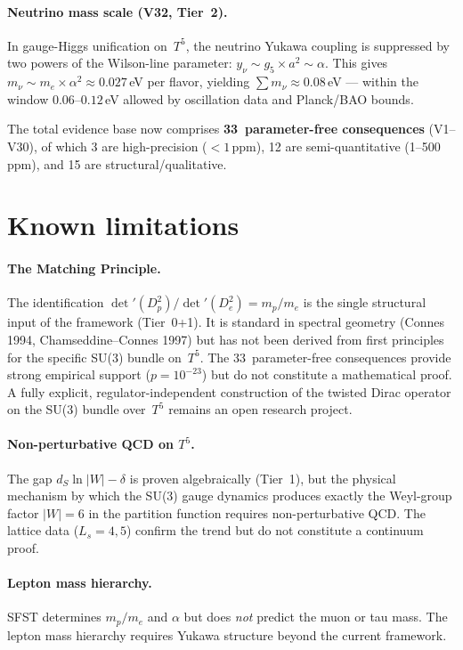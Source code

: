 \documentclass[11pt,a4paper]{article}
\theoremstyle{definition}
\theoremstyle{remark}
\begin{document}
\paragraph{Neutrino mass scale (V32, Tier~2).}
In gauge-Higgs unification on~$T^5$, the neutrino Yukawa coupling is
suppressed by two powers of the Wilson-line parameter:
$y_\nu \sim g_5 \times a^2 \sim \alpha$.
This gives $m_\nu \sim m_e \times \alpha^2 \approx 0.027\,$eV per flavor,
yielding $\sum m_\nu \approx 0.08\,$eV --- within the window
$0.06$--$0.12\,$eV allowed by oscillation data and Planck/BAO bounds.

The total evidence base now comprises \textbf{33~parameter-free consequences}
(V1--V30), of which 3 are high-precision ($<\!1\,$ppm), 12 are
semi-quantitative (1--500\,ppm), and 15 are structural/qualitative.

\section{Known limitations}
\label{sec:limitations}

\paragraph{The Matching Principle.}
The identification $\det'(D_p^2)/\det'(D_e^2) = m_p/m_e$ is the
single structural input of the framework (Tier~0+1).  It is standard
in spectral geometry (Connes 1994, Chamseddine--Connes 1997) but has not
been derived from first principles for the specific SU(3) bundle on~$T^5$.
The 33~parameter-free consequences provide strong empirical support
($p = 10^{-23}$) but do not constitute a mathematical proof.
A fully explicit, regulator-independent construction of the twisted
Dirac operator on the SU(3) bundle over~$T^5$ remains an open
research project.

\paragraph{Non-perturbative QCD on $T^5$.}
The gap $d_S\ln|W|-\delta$ is proven algebraically (Tier~1),
but the physical mechanism by which the SU(3) gauge dynamics
produces exactly the Weyl-group factor $|W|=6$ in the partition
function requires non-perturbative QCD.  The lattice data
($L_s=4,5$) confirm the trend but do not constitute a
continuum proof.

\paragraph{Lepton mass hierarchy.}
SFST determines $m_p/m_e$ and $\alpha$ but does \emph{not}
predict the muon or tau mass.  The lepton mass hierarchy
requires Yukawa structure beyond the current framework.
\end{document}
